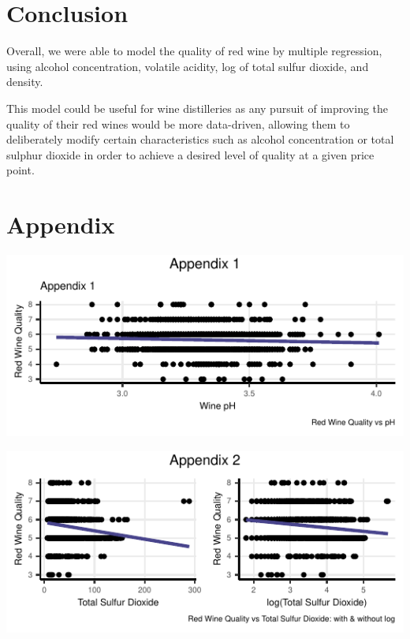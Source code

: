 \documentclass[letterpaper,8pt,twocolumn,twoside,]{pinp}
\begin{document}
\hypertarget{conclusion}{%
\section{Conclusion}\label{conclusion}}

Overall, we were able to model the quality of red wine by multiple
regression, using alcohol concentration, volatile acidity, log of total
sulfur dioxide, and density.

This model could be useful for wine distilleries as any pursuit of
improving the quality of their red wines would be more data-driven,
allowing them to deliberately modify certain characteristics such as
alcohol concentration or total sulphur dioxide in order to achieve a
desired level of quality at a given price point.

\pagebreak

\hypertarget{appendix}{%
\section{Appendix}\label{appendix}}

\begin{center}\includegraphics{DATA2002_ExecutiveSummary_files/figure-latex/unnamed-chunk-4-1} \end{center}

\begin{center}\includegraphics{DATA2002_ExecutiveSummary_files/figure-latex/unnamed-chunk-4-2} \end{center}
\end{document}
